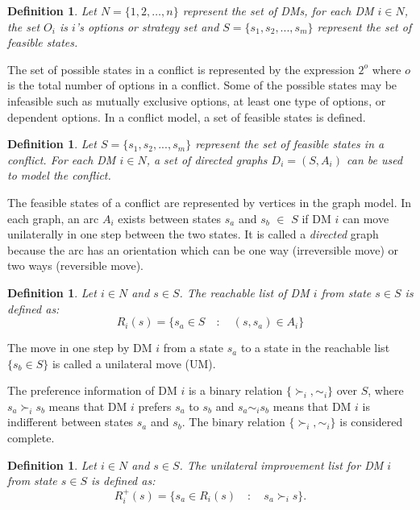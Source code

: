 \documentclass[letterpaper,12pt,titlepage,oneside,final]{book}
\newtheorem{definition}[lemma]{Definition}
\begin{document}
\begin{definition}
\rm
Let $N=\{1,2,\dots,n\}$ represent the set of DMs, for each DM $i \in N$, the set $O_{i}$ is $i$'s options or strategy set and $S=\{s_1, s_2, ..., s_m\}$ represent the set of feasible states.
\end{definition}

The set of possible states in a conflict is represented by the expression $2^o$ where $o$ is the total number of options in a conflict. Some of the possible states may be infeasible such as mutually exclusive options, at least one type of options, or dependent options. In a conflict model, a set of feasible states is defined.

\begin{definition}
\rm
Let  $S=\{s_1, s_2, ..., s_m\}$ represent the set of feasible states in a conflict. For each DM $i \in N$, a set of directed graphs $D_{i}=(S,A_{i})$ can be used to model the conflict.
\end{definition}


The feasible states of a conflict are represented by vertices in the graph model. In each graph, an arc $A_{i}$ exists between states $s_a$ and $s_b$ $\in$ $S$ if DM $i$ can move unilaterally in one step between the two states. It is called a \emph{directed} graph because the arc has an orientation which can be one way (irreversible move) or two ways (reversible move).

\begin{definition}
\rm
Let $i \in N$ and $s \in S$. The reachable list of DM $i$ from state $s \in S$ is defined as:
$$R_i(s)=\{s_a \in S \quad : \quad (s, s_a) \in A_i\}$$
\end{definition}

The move in one step by DM $i$ from a state $s_a$ to a state in the reachable list $\{s_b\in S\}$ is called a unilateral move (UM).

The preference information of DM $i$ is a binary relation $\{\succ_i,\sim_i\}$ over $S$, where $s_a\succ_i s_b$ means that DM $i$ prefers $s_a$ to $s_b$ and $s_a\sim_i s_b$ means that DM $i$ is indifferent between states $s_a$ and $s_b$. The binary relation $\{\succ_i,\sim_i\}$ is considered complete.

\begin{definition}
\rm
Let $i \in N$ and $s \in S$. The unilateral improvement list for DM $i$ from state $s \in S$ is defined as:
$$R_i^+(s)=\{s_a \in R_i(s) \quad : \quad s_a\succ_i s\}.$$
\end{definition}
\end{document}
